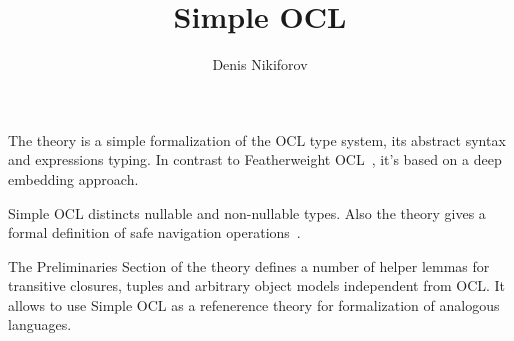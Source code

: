 \documentclass[11pt,a4paper]{book}
\makeatletter
\newenvironment{abstract}{%
  \small
  \begin{center}%
    {\bfseries \abstractname\vspace{-.5em}\vspace{\z@}}%
  \end{center}%
  \quotation}{\endquotation}
\makeatother
\begin{document}
\title{Simple OCL}
\author{Denis Nikiforov}
\maketitle

\begin{abstract}
  The theory is a simple formalization of the OCL type system,
  its abstract syntax and expressions typing.
  In contrast to Featherweight OCL~\cite{Featherweight_OCL-AFP},
  it's based on a deep embedding approach.

  Simple OCL distincts nullable and non-nullable types. Also
  the theory gives a formal definition of safe navigation
  operations~\cite{DBLP:conf/models/Willink15}.

  The Preliminaries Section of the theory defines a number of
  helper lemmas for transitive closures, tuples and arbitrary
  object models independent from OCL. It allows to use
  Simple OCL as a refenerence theory for formalization of
  analogous languages.
\end{abstract}

\tableofcontents





\end{document}
